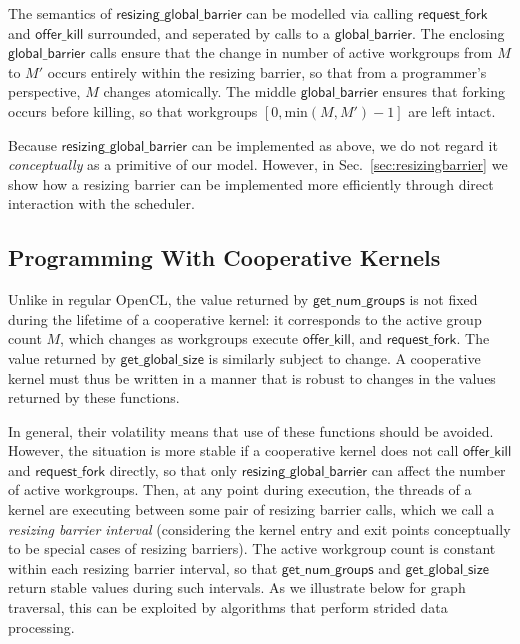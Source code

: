 \documentclass[parskip=half,sigconf,review, anonymous=true, acmcopyrightmode=none]{acmart}
\newcommand{\mysec}{Sec.~}
\newcommand{\offerfork}{\mathsf{request\_fork}}
\newcommand{\offerkill}{\mathsf{offer\_kill}}
\newcommand{\globalbarrier}{\mathsf{global\_barrier}}
\newcommand{\resizingglobalbarrier}{\mathsf{resizing\_global\_barrier}}
\newcommand{\getnumgroups}{\mathsf{get\_num\_groups}}
\newcommand{\getglobalsize}{\mathsf{get\_global\_size}}
\begin{document}
The semantics of $\resizingglobalbarrier$ can be modelled via calling $\offerfork$ and $\offerkill$
surrounded, and seperated by calls to a $\globalbarrier$.
%
%
The enclosing $\globalbarrier$ calls ensure that the change in number
of active workgroups from $M$ to $M'$ occurs entirely within the
resizing barrier, so that from a programmer's perspective, $M$ changes atomically.  The middle $\globalbarrier$ ensures that forking occurs before killing, so that workgroups $[0, \textrm{min}(M, M') - 1]$ are left intact.

Because $\resizingglobalbarrier$ can be implemented as above, we do not regard it \emph{conceptually} as a primitive of our
model.  However, in
\mysec\ref{sec:resizingbarrier} we show how a resizing barrier can be
implemented more efficiently through direct interaction with the scheduler.

\subsection{Programming With Cooperative Kernels}\label{sec:programmingguidelines}


 Unlike in regular OpenCL, the
value returned by $\getnumgroups$ is not fixed during the lifetime of
a cooperative kernel: it corresponds to the active group count $M$,
which changes as workgroups execute $\offerkill$, and $\offerfork$.
The value returned by $\getglobalsize$ is similarly subject to change.
A cooperative kernel must thus be written in a manner that is robust
to changes in the values returned by these functions.

In general, their volatility means that use of these functions should
be avoided.  However, the situation is more stable if a cooperative
kernel does not call $\offerkill$ and $\offerfork$ directly, so that
only $\resizingglobalbarrier$ can affect the number of active
workgroups.  Then, at any point during execution, the threads of a
kernel are executing between some pair of resizing barrier calls,
which we call a \emph{resizing barrier interval} (considering the
kernel entry and exit points conceptually to be special cases of
resizing barriers).  The active workgroup count is constant within
each resizing barrier interval, so that $\getnumgroups$ and
$\getglobalsize$ return stable values during such intervals.
%
As we illustrate below for graph traversal, this can be exploited by algorithms that perform strided
data processing.
\end{document}

